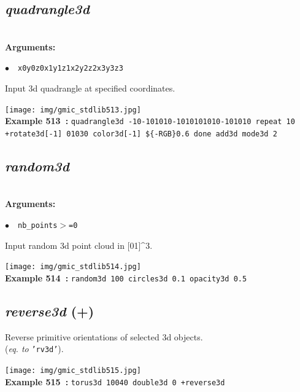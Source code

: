 \documentclass[a4paper,10.5pt,twoside]{book}
\def\comma{\discretionary{,}{}{,}}
\newcommand{\Cb}[1]{\textcolor{cb}{#1}}
\begin{document}
\subsection{\emph{quadrangle3d} }\vspace*{-0.7em}
~\\\textbf{\Cb{Arguments: }}\begin{flushleft}
{\small \Cb{\hspace*{0.5cm}$\bullet$~~\texttt{x0{\comma}y0{\comma}z0{\comma}x1{\comma}y1{\comma}z1{\comma}x2{\comma}y2{\comma}z2{\comma}x3{\comma}y3{\comma}z3}}}\end{flushleft}
Input 3d quadrangle at specified coordinates.
\begin{center}\texttt{[image: img/gmic\_stdlib513.jpg]}\\
{\footnotesize \textbf{Example 513~:} \texttt{quadrangle3d -10{\comma}-10{\comma}10{\comma}10{\comma}-10{\comma}10{\comma}10{\comma}10{\comma}10{\comma}-10{\comma}10{\comma}10 repeat 10 +rotate3d[-1] 0{\comma}1{\comma}0{\comma}30 color3d[-1] \$\{-RGB\}{\comma}0.6 done add3d mode3d 2}}
\end{center}

\subsection{\emph{random3d} }\vspace*{-0.7em}
~\\\textbf{\Cb{Arguments: }}\begin{flushleft}
{\small \Cb{\hspace*{0.5cm}$\bullet$~~\texttt{nb\_points$>$=0}}}\end{flushleft}
Input random 3d point cloud in [0{\comma}1]\textasciicircum 3.
\begin{center}\texttt{[image: img/gmic\_stdlib514.jpg]}\\
{\footnotesize \textbf{Example 514~:} \texttt{random3d 100 circles3d 0.1 opacity3d 0.5}}
\end{center}

\subsection{\emph{reverse3d} (+)}\vspace*{-0.7em}
Reverse primitive orientations of selected 3d objects.
~\\(\emph{eq. to} {\small \texttt{'rv3d'}}).
\begin{center}\texttt{[image: img/gmic\_stdlib515.jpg]}\\
{\footnotesize \textbf{Example 515~:} \texttt{torus3d 100{\comma}40 double3d 0 +reverse3d}}
\end{center}
\end{document}
